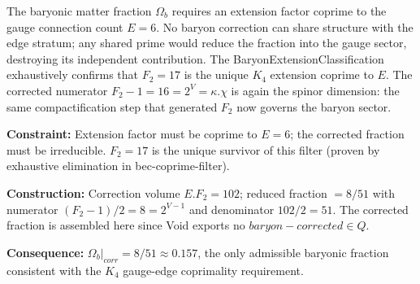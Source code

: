 \documentclass[11pt,a4paper]{book}
\def\cdot{.}%
\def\mathrm#1{#1}%
\def\mathbb#1{#1}%
\def\texttt#1{#1}%
\begin{document}
The baryonic matter fraction $\Omega_b$ requires an extension factor coprime to the
gauge connection count $E = 6$.  No baryon correction can share structure with the
edge stratum; any shared prime would reduce the fraction into the gauge sector,
destroying its independent contribution.  The \texttt{BaryonExtensionClassification}
exhaustively confirms that $F_2 = 17$ is the unique $K_4$ extension coprime to $E$.
The corrected numerator $F_2 - 1 = 16 = 2^V = \kappa \cdot \chi$ is again the spinor
dimension: the same compactification step that generated $F_2$ now governs the baryon sector.

\medskip
\noindent
\textbf{Constraint:}
Extension factor must be coprime to $E = 6$; the corrected fraction must be irreducible.
$F_2 = 17$ is the unique survivor of this filter (proven by exhaustive elimination in
\texttt{bec-coprime-filter}).

\noindent
\textbf{Construction:}
Correction volume $E \cdot F_2 = 102$; reduced fraction $= 8/51$ with numerator
$(F_2 - 1)/2 = 8 = 2^{V-1}$ and denominator $102/2 = 51$.  The corrected
fraction is assembled here since Void exports no $\texttt{baryon-corrected} \in \mathbb{Q}$.

\noindent
\textbf{Consequence:}
$\Omega_b|_{\mathrm{corr}} = 8/51 \approx 0.157$, the only admissible baryonic
fraction consistent with the $K_4$ gauge-edge coprimality requirement.
\end{document}
